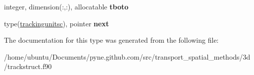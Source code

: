 \begin{DoxyCompactItemize}
\item 
integer, dimension(\+:,\+:), allocatable {\bfseries tboto}\hypertarget{structtracking__data__structures_1_1trackingunitsc_a6b3cceaa9cf6b60ea0330fc48f3ab107}{}\label{structtracking__data__structures_1_1trackingunitsc_a6b3cceaa9cf6b60ea0330fc48f3ab107}

\item 
type(\hyperlink{structtracking__data__structures_1_1trackingunitsc}{trackingunitsc}), pointer {\bfseries next}\hypertarget{structtracking__data__structures_1_1trackingunitsc_ad91a2408f427440a9f4a543bc5923a92}{}\label{structtracking__data__structures_1_1trackingunitsc_ad91a2408f427440a9f4a543bc5923a92}

\end{DoxyCompactItemize}


The documentation for this type was generated from the following file\+:\begin{DoxyCompactItemize}
\item 
/home/ubuntu/\+Documents/pyne.\+github.\+com/src/transport\+\_\+spatial\+\_\+methods/3d/trackstruct.\+f90\end{DoxyCompactItemize}
